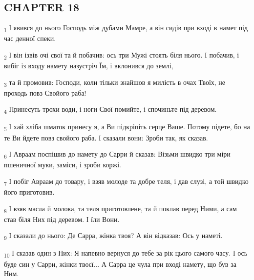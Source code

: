 \subsection{CHAPTER 18}
\begin{tcolorbox}
\textsubscript{1} І явився до нього Господь між дубами Мамре, а він сидів при вході в намет під час денної спеки.
\end{tcolorbox}
\begin{tcolorbox}
\textsubscript{2} І він ізвів очі свої та й побачив: ось три Мужі стоять біля нього. І побачив, і вибіг із входу намету назустріч Їм, і вклонився до землі,
\end{tcolorbox}
\begin{tcolorbox}
\textsubscript{3} та й промовив: Господи, коли тільки знайшов я милість в очах Твоїх, не проходь повз Свойого раба!
\end{tcolorbox}
\begin{tcolorbox}
\textsubscript{4} Принесуть трохи води, і ноги Свої помийте, і спочиньте під деревом.
\end{tcolorbox}
\begin{tcolorbox}
\textsubscript{5} І хай хліба шматок принесу я, а Ви підкріпіть серце Ваше. Потому підете, бо на те Ви йдете повз свойого раба. І сказали вони: Зроби так, як сказав.
\end{tcolorbox}
\begin{tcolorbox}
\textsubscript{6} І Авраам поспішив до намету до Сарри й сказав: Візьми швидко три міри пшеничної муки, заміси, і зроби коржі.
\end{tcolorbox}
\begin{tcolorbox}
\textsubscript{7} І побіг Авраам до товару, і взяв молоде та добре теля, і дав слузі, а той швидко його приготовив.
\end{tcolorbox}
\begin{tcolorbox}
\textsubscript{8} І взяв масла й молока, та теля приготовлене, та й поклав перед Ними, а сам став біля Них під деревом. І їли Вони.
\end{tcolorbox}
\begin{tcolorbox}
\textsubscript{9} І сказали до нього: Де Сарра, жінка твоя? А він відказав: Ось у наметі.
\end{tcolorbox}
\begin{tcolorbox}
\textsubscript{10} І сказав один з Них: Я напевно вернуся до тебе за рік цього самого часу. І ось буде син у Сарри, жінки твоєї... А Сарра це чула при вході намету, що був за Ним.
\end{tcolorbox}
